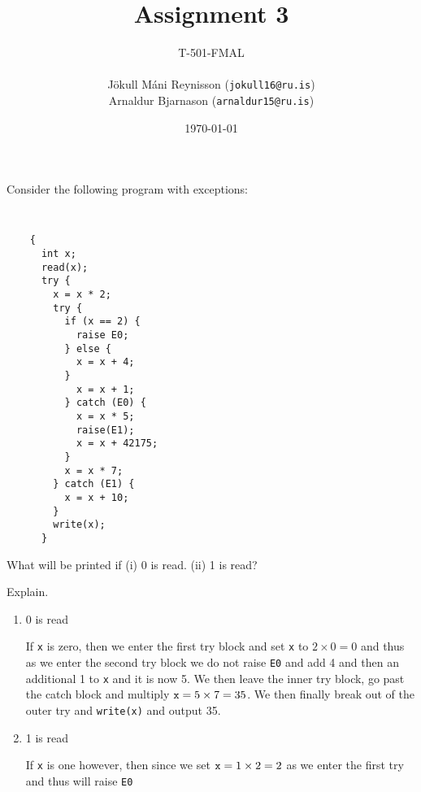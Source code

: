\documentclass[11pt]{exam}
\begin{document}
\title{Assignment 3}
    \author{{\small T-501-FMAL} \\ \quad \\ Jökull Máni Reynisson ({\tt jokull16@ru.is}) \\  Arnaldur Bjarnason ({\tt arnaldur15@ru.is})}
\date{\today}
\maketitle

\begin{questions}


\question Consider the following program with exceptions:
{\tt
  \begin{lstlisting}
    {
      int x;
      read(x);
      try {
        x = x * 2;
        try {
          if (x == 2) {
            raise E0;
          } else {
            x = x + 4;
          }
            x = x + 1;
          } catch (E0) {
            x = x * 5;
            raise(E1);
            x = x + 42175;
          }
          x = x * 7;
        } catch (E1) {
          x = x + 10;
        }
        write(x);
      }
  \end{lstlisting}
}
What will be printed if (i) 0 is read. (ii) 1 is read?

Explain.

        \begin{enumerate}[label=(\roman*)]
            \item 0 is read
                \begin{framed}
                    If {\tt x} is zero, then we enter the first try block and set {\tt x} to $2\times 0 = 0$ and thus as we enter the second try block we do not raise {\tt E0} and add 4 and then an additional 1 to {\tt x} and it is now 5. We then leave the inner try block, go past the catch block and multiply ${\tt x} = 5 \times 7 = 35$.
                    We then finally break out of the outer try and {\tt write(x)} and output 35.
                \end{framed}

            \item 1 is read
                \begin{framed}
                    If {\tt x} is one however, then since we set ${\tt x} = 1 \times 2 = 2$ as we enter the first try and thus will raise {\tt E0}
                \end{framed}
        \end{enumerate}




\end{questions}
\end{document}
